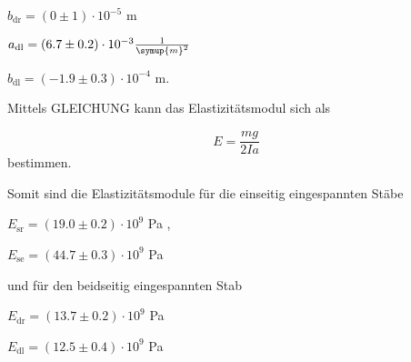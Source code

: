 \centerline{$b_\text{dr} = (0 \pm 1) \cdot 10^{-5} $ m}
\vspace{1em}
\centerline{$a_\text{dl} = (6.7 \pm 0.2) \cdot 10^{-3} \frac{1}{\symup{m}^2} $}

\centerline{$b_\text{dl} = (-1.9 \pm 0.3) \cdot 10^{-4} $ m.}
\vspace{1em}

Mittels GLEICHUNG kann das Elastizitätsmodul sich als

\begin{equation}
  E = \frac{m g}{2 I a}
\end{equation}
bestimmen.

Somit sind die Elastizitätsmodule für die einseitig eingespannten Stäbe

\vspace{.5em}
\centerline{$E_\text{sr} = (19.0 \pm 0.2) \cdot 10^9$ Pa ,}
\vspace{.5em}

\vspace{.5em}
\centerline{$E_\text{se} = (44.7 \pm 0.3) \cdot 10^9$ Pa}
\vspace{.5em}

und für den beidseitig eingespannten Stab

\vspace{.5em}
\centerline{$E_\text{dr}  = (13.7 \pm 0.2) \cdot 10^9$ Pa}
\vspace{.5em}

\vspace{.5em}
\centerline{$E_\text{dl}  = (12.5 \pm 0.4) \cdot 10^9$ Pa}
\vspace{.5em}

